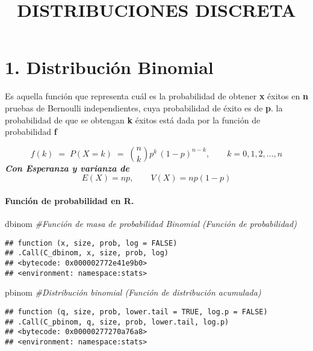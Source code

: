 \documentclass[
]{article}
\title{DISTRIBUCIONES DISCRETA}
\author{}
\date{\vspace{-2.5em}}
\newenvironment{Shaded}{\begin{snugshade}}{\end{snugshade}}
\newcommand{\CommentTok}[1]{\textcolor[rgb]{0.56,0.35,0.01}{\textit{#1}}}
\newcommand{\NormalTok}[1]{#1}
\begin{document}
\maketitle

\hypertarget{distribuciuxf3n-binomial}{%
\section{1. Distribución Binomial}\label{distribuciuxf3n-binomial}}

Es aquella función que representa cuál es la probabilidad de obtener
\textbf{x} éxitos en \textbf{n} pruebas de Bernoulli independientes,
cuya probabilidad de éxito es de \textbf{p}. \pagebreak la probabilidad
de que se obtengan \textbf{k} éxitos está dada por la función de
probabilidad \textbf{f}

\[f(k) \;=\; P(X=k)  \;=\; {n\choose k} p^k\, (1-p)^{n-k}, \qquad k=0,1,2, \ldots, n\]
\textbf{\emph{Con Esperanza y varianza de}}
\[E(X)= np, \qquad V(X)= np(1-p)\]

\hypertarget{funciuxf3n-de-probabilidad-en-r.}{%
\paragraph{Función de probabilidad en
R.}\label{funciuxf3n-de-probabilidad-en-r.}}

\begin{Shaded}
\begin{Highlighting}[]
\NormalTok{dbinom }\CommentTok{\#Función de masa de probabilidad Binomial (Función de probabilidad)}
\end{Highlighting}
\end{Shaded}

\begin{verbatim}
## function (x, size, prob, log = FALSE) 
## .Call(C_dbinom, x, size, prob, log)
## <bytecode: 0x000002772e41e9b0>
## <environment: namespace:stats>
\end{verbatim}

\begin{Shaded}
\begin{Highlighting}[]
\NormalTok{pbinom }\CommentTok{\#Distribución binomial (Función de distribución acumulada)}
\end{Highlighting}
\end{Shaded}

\begin{verbatim}
## function (q, size, prob, lower.tail = TRUE, log.p = FALSE) 
## .Call(C_pbinom, q, size, prob, lower.tail, log.p)
## <bytecode: 0x00000277270a76a8>
## <environment: namespace:stats>
\end{verbatim}
\end{document}
